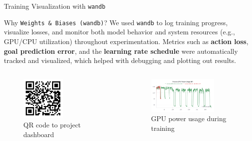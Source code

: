 \documentclass{beamer}
\begin{document}
\begin{frame}{Training Visualization with \texttt{wandb}}

    \begin{block}{Why \texttt{Weights \& Biases (wandb)}?}
        We used \texttt{wandb} to log training progress, visualize losses, and monitor both model behavior and system resources (e.g., GPU/CPU utilization) throughout experimentation. 
        Metrics such as \textbf{action loss}, \textbf{goal prediction error}, and the \textbf{learning rate schedule} were automatically tracked and visualized, 
        which helped with debugging and plotting out results.
    \end{block}

    \begin{columns}
        \begin{column}{0.4\textwidth}
            \begin{figure}
                \includegraphics[width=0.5\textwidth]{images/qr_wandb.png}
                \caption{QR code to project dashboard}
            \end{figure}
        \end{column}
        \begin{column}{0.6\textwidth}
            \begin{figure}
                \includegraphics[width=0.8\textwidth]{images/gpu_powerusage.png}
                \caption{GPU power usage during training}
            \end{figure}
        \end{column}
    \end{columns}

\end{frame}
\end{document}

